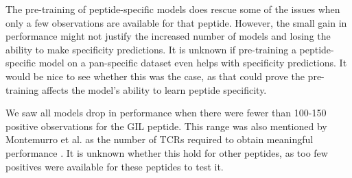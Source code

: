 The pre-training of peptide-specific models does rescue some of the issues when only a few observations are available for that peptide. However, the small gain in performance might not justify the increased number of models and losing the ability to make specificity predictions. It is unknown if pre-training a peptide-specific model on a pan-specific dataset even helps with specificity predictions. It would be nice to see whether this was the case, as that could prove the pre-training affects the model's ability to learn peptide specificity.

We saw all models drop in performance when there were fewer than 100-150 positive observations for the GIL peptide. This range was also mentioned by Montemurro et al. as the number of TCRs required to obtain meaningful performance \cite{Montemurro2021NetTCR-2.0Data}. It is unknown whether this hold for other peptides, as too few positives were available for these peptides to test it.


